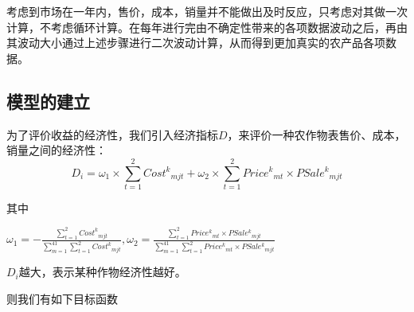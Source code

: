 \documentclass[withoutpreface,bwprint]{cumcmthesis} %
\begin{document}
考虑到市场在一年内，售价，成本，销量并不能做出及时反应，只考虑对其做一次计算，不考虑循环计算。在每年进行完由不确定性带来的各项数据波动之后，再由其波动大小通过上述步骤进行二次波动计算，从而得到更加真实的农产品各项数据。



\subsection{模型的建立}
为了评价收益的经济性，我们引入经济指标$D$，来评价一种农作物表售价、成本，销量之间的经济性：
\begin{equation}
D_i=\omega _1\times \sum_{t=1}^2{{Cost^k}_{mjt}}+\omega _2\times \sum_{t=1}^2{{Price^k}_{mt}\times {PSale^k}_{mjt}}
\end{equation}

其中

$\omega _1=-\frac{\sum_{t=1}^2{{Cost^k}_{mjt}}}{\sum_{m=1}^{41}{\sum_{t=1}^2{{Cost^k}_{mjt}}}},\omega _2=\frac{\sum_{t=1}^2{{Price^k}_{mt}\times {PSale^k}_{mjt}}}{\sum_{m=1}^{41}{\sum_{t=1}^2{{Price^k}_{mt}\times {PSale^k}_{mjt}}}}
$

$D_i$越大，表示某种作物经济性越好。

则我们有如下目标函数
\end{document}
